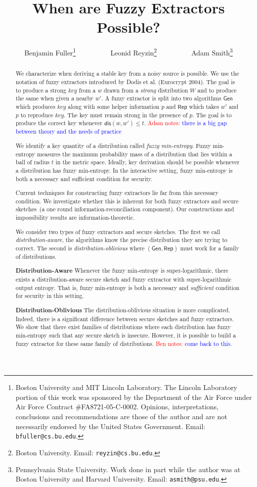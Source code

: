 \documentclass[11pt]{article}
\title{When are Fuzzy Extractors Possible?}
\author{Benjamin Fuller\footnote{Boston University and MIT Lincoln Laboratory. The Lincoln Laboratory portion of this
work was sponsored by the Department of the Air Force under Air Force
Contract
\#FA8721-05-C-0002.  Opinions,
interpretations, conclusions and recommendations are those of the author
and
are not necessarily endorsed by the United States Government.  Email: {\tt bfuller@cs.bu.edu}.}~~~~~~~~~~Leonid Reyzin\footnote{Boston University.  Email: {\tt reyzin@cs.bu.edu}.}~~~~~~~~~~Adam Smith\footnote{Pennsylvania State University. Work done in part while the author was at Boston University and Harvard University.  Email: {\tt asmith@psu.edu}.  }}
\newcommand{\class}[1]{{\ensuremath{\mathsf{#1}}}}
\newcommand{\gen}{\ensuremath{\class{Gen}}\xspace}
\newcommand{\rep}{\ensuremath{\class{Rep}}\xspace}
\newcommand{\dis}{\ensuremath{\mathsf{dis}}}
\newcommand{\authnote}[2]{{\textcolor{red}{\textsf{#1 notes: }\textcolor{blue}{ #2}}\marginpar{\textcolor{red}{\textbf{!!!!!}}}}}
\newcommand{\authnote}[2]{}
\newcommand{\bnote}[1]{{\authnote{Ben}{#1}}}
\newcommand{\anote}[1]{{\authnote{Adam}{#1}}}
\begin{document}
\maketitle

\begin{abstract}
We characterize when deriving a stable key from a noisy source is possible.  We use the notation of fuzzy extractors introduced by Dodis et al. (Eurocrypt 2004).  The goal is to produce a strong $key$ from a $w$ drawn from a \emph{strong} distribution $W$ and to produce the same when given a nearby $w'$.  A fuzzy extractor is split into two algorithms $\gen$ which produces $key$ along with some helper information $p$ and $\rep$ which takes $w'$ and $p$ to reproduce $key$.  The key must remain strong in the presence of $p$.  The goal is to produce the correct key whenever $\dis(w, w')\le t$.
\anote{there is a big gap between theory and the needs of practice}

We identify a key quantity of a distribution called \emph{fuzzy min-entropy}.  Fuzzy min-entropy measures the maximum probability mass of a distribution that lies within a ball of radius $t$ in the metric space.  Ideally, key derivation should be possible whenever a distribution has fuzzy min-entropy.  In the interactive setting, fuzzy min-entropy is both a necessary and sufficient condition for security.  

Current techniques for constructing fuzzy extractors lie far from this necessary condition.  We investigate whether this is inherent for both fuzzy extractors and secure sketches~(a one round information-reconciliation component).  Our constructions and impossibility results are information-theoretic.  

We consider two types of fuzzy extractors and secure sketches.  The first we call \emph{distribution-aware}, the algorithms know the precise distribution they are trying to correct.  The second is \emph{distribution-oblivious} where $(\gen, \rep)$ must work for a family of distributions.

\textbf{Distribution-Aware} Whenever the fuzzy min-entropy is super-logarithmic, there exists a distribution-aware secure sketch and fuzzy extractor with super-logarithmic output entropy.  That is, fuzzy min-entropy is both a necessary and \emph{sufficient} condition for security in this setting.

\textbf{Distribution-Oblivious} The distribution-oblivious situation is more complicated.  Indeed, there is a significant difference between secure sketches and fuzzy extractors.  We show that there exist families of distributions where each distribution has fuzzy min-entropy such that any secure sketch is insecure.  However, it is possible to build a fuzzy extractor for these same family of distributions.
\bnote{come back to this.}
\end{abstract}
\end{document}

